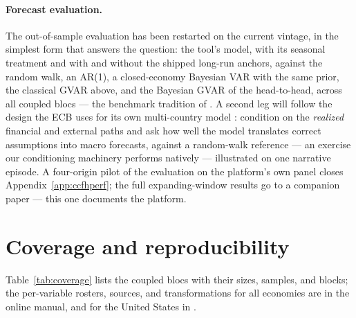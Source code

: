 \documentclass[11pt]{article}
\begin{document}
\paragraph{Forecast evaluation.} The out-of-sample evaluation has been restarted on the
current vintage, in the simplest form that answers the question: the tool's model, with
its seasonal treatment and with and without the shipped long-run anchors, against the
random walk, an AR(1), a closed-economy Bayesian VAR with the same prior, the classical
GVAR above, and the Bayesian GVAR of the head-to-head, across all coupled blocs --- the
benchmark tradition of \citet{AdolfsonLindeVillani2007}. A second leg will follow the design the ECB uses for its
own multi-country model \citep{AngeliniBokanCiccarelliLalikZimic2025}: condition on the
\emph{realized} financial and external paths and ask how well the model translates correct
assumptions into macro forecasts, against a random-walk reference --- an exercise our
conditioning machinery performs natively --- illustrated on one narrative episode. A
four-origin pilot of the evaluation on the platform's own panel closes
Appendix~\ref{app:ccfhperf}; the full expanding-window results go to a companion paper ---
this one documents the platform.



\section{Coverage and reproducibility}\label{app:repro}

Table~\ref{tab:coverage} lists the coupled blocs with their sizes, samples, and blocks;
the per-variable rosters, sources, and transformations for all \NModels{} economies are in
the online manual, and for the United States in
\citet{CrumpEusepiGiannoneQianSbordone2025}.

{\small }
\end{document}
